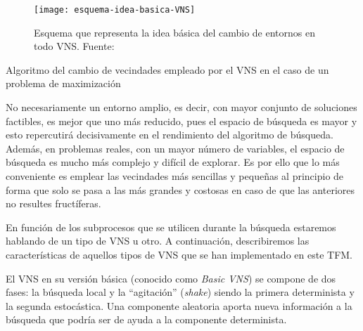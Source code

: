 \begin{figure}
    \centering
    \texttt{[image: esquema-idea-basica-VNS]}
    \caption[Esquema que representa la idea básica del cambio de entornos en todo VNS]{Esquema que representa la idea básica del cambio de entornos en todo VNS. Fuente:~\cite{sota:metaheuristicas-design-impl}}
    \label{fig:esquema-idea-basica-VNS}
\end{figure}

\begin{algorithm}[htbp]
    \caption{Algoritmo del cambio de vecindades empleado por el VNS en el caso de un problema de maximización}
    \label{algoritmo:VNS-cambio-entornos}

    \DontPrintSemicolon
    \medskip

\end{algorithm}

No necesariamente un entorno amplio, es decir, con mayor conjunto de soluciones factibles, es mejor que uno más reducido, pues el espacio de búsqueda es mayor y esto repercutirá decisivamente en el rendimiento del algoritmo de búsqueda. Además, en problemas reales, con un mayor número de variables, el espacio de búsqueda es mucho más complejo y difícil de explorar. Es por ello que lo más conveniente es emplear las vecindades más sencillas y pequeñas al principio de forma que solo se pasa a las más grandes y costosas en caso de que las anteriores no resultes fructíferas.

En función de los subprocesos que se utilicen durante la búsqueda estaremos hablando de un tipo de VNS u otro. A continuación, describiremos las características de aquellos tipos de VNS que se han implementado en este TFM\@.

El VNS en su versión básica (conocido como \textit{Basic VNS}) se compone de dos fases: la búsqueda local y la ``agitación'' (\textit{shake}) siendo la primera determinista y la segunda estocástica. Una componente aleatoria aporta nueva información a la búsqueda que podría ser de ayuda a la componente determinista.

